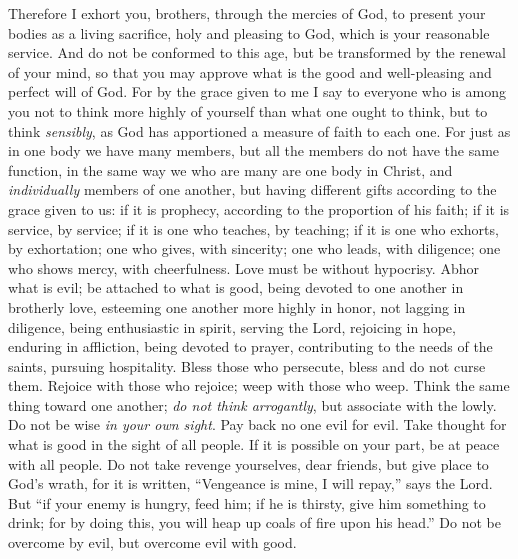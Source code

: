 \begin{biblechapter} %
 Therefore I exhort you, brothers, through the mercies of God, to present your bodies as a living sacrifice, holy and pleasing to God, which is your reasonable service.
\verse And do not be conformed to this age, but be transformed by the renewal of your mind, so that you may approve what is the good and well-pleasing and perfect will of God.
 For by the grace given to me I say to everyone who is among you not to think more highly of yourself than what one ought to think, but to think \textit{sensibly}, as God has apportioned a measure of faith to each one.
\verse For just as in one body we have many members, but all the members do not have the same function,
\verse in the same way we who are many are one body in Christ, and \textit{individually} members of one another,
\verse but having different gifts according to the grace given to us: if it is prophecy, according to the proportion of his faith;
\verse if it is service, by service; if it is one who teaches, by teaching;
\verse if it is one who exhorts, by exhortation; one who gives, with sincerity; one who leads, with diligence; one who shows mercy, with cheerfulness.
 Love must be without hypocrisy. Abhor what is evil; be attached to what is good,
\verse being devoted to one another in brotherly love, esteeming one another more highly in honor,
\verse not lagging in diligence, being enthusiastic in spirit, serving the Lord,
\verse rejoicing in hope, enduring in affliction, being devoted to prayer,
\verse contributing to the needs of the saints, pursuing hospitality.
\verse Bless those who persecute, bless and do not curse them.
\verse Rejoice with those who rejoice; weep with those who weep.
\verse Think the same thing toward one another; \textit{do not think arrogantly}, but associate with the lowly. Do not be wise \textit{in your own sight}.
\verse Pay back no one evil for evil. Take thought for what is good in the sight of all people.
\verse If it is possible on your part, be at peace with all people.
\verse Do not take revenge yourselves, dear friends, but give place to God’s wrath, for it is written, “Vengeance is mine, I will repay,” says the Lord.
\verse But “if your enemy is hungry, feed him; if he is thirsty, give him something to drink; for by doing this, you will heap up coals of fire upon his head.”
\verse Do not be overcome by evil, but overcome evil with good.
\end{biblechapter}

